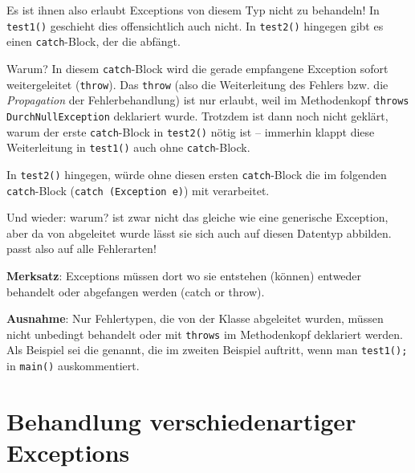 Es ist ihnen also erlaubt Exceptions von diesem Typ nicht zu behandeln! In
\lstinline|test1()| geschieht dies offensichtlich auch nicht. In
\lstinline|test2()| hingegen gibt es einen \lstinline|catch|-Block, der die
 abfängt.

Warum? In diesem \lstinline|catch|-Block wird die gerade empfangene Exception
sofort weitergeleitet (\lstinline|throw|). Das \lstinline|throw| (also die
Weiterleitung des Fehlers bzw. die {\em Propagation} der Fehlerbehandlung)
ist nur erlaubt, weil im Methodenkopf \lstinline|throws DurchNullException|
deklariert wurde. Trotzdem ist dann noch nicht geklärt, warum der erste
\lstinline|catch|-Block in \lstinline|test2()| nötig ist -- immerhin klappt
diese Weiterleitung in \lstinline|test1()| auch ohne \lstinline|catch|-Block.

In \lstinline|test2()| hingegen, würde ohne diesen ersten
\lstinline|catch|-Block die  im folgenden
\lstinline|catch|-Block (\lstinline|catch (Exception e)|) mit \glqq
verarbeitet\grqq .

Und wieder: warum?  ist zwar nicht das gleiche wie
eine generische Exception, aber da  von
 abgeleitet wurde lässt sie sich auch auf diesen Datentyp
abbilden.  passt also auf alle Fehlerarten!

\textbf{Merksatz}: Exceptions müssen dort wo sie entstehen (können) entweder
behandelt oder abgefangen werden (\glqq catch or throw\grqq ).

\textbf{Ausnahme}: Nur Fehlertypen, die von der Klasse
 abgeleitet wurden, müssen nicht unbedingt behandelt
oder mit \lstinline|throws| im Methodenkopf deklariert werden. Als Beispiel sei
die  genannt,  die im zweiten Beispiel auftritt,
wenn man \lstinline|test1();| in \lstinline|main()| auskommentiert.


\section{Behandlung verschiedenartiger Exceptions}


